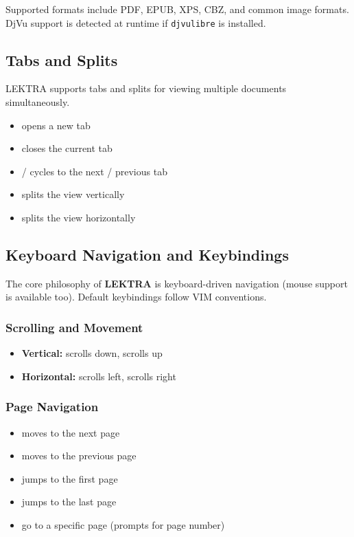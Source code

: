\documentclass[a4paper,12pt]{article}
\begin{document}
Supported formats include PDF, EPUB, XPS, CBZ, and common image formats. DjVu support is detected at runtime if \texttt{djvulibre} is installed.

\subsection{Tabs and Splits}

LEKTRA supports tabs and splits for viewing multiple documents simultaneously.

\begin{itemize}[leftmargin=*]
    \item {} opens a new tab
    \item {} closes the current tab
    \item {} /  cycles to the next / previous tab
    \item {} splits the view vertically
    \item {} splits the view horizontally
\end{itemize}

\subsection{Keyboard Navigation and Keybindings}

The core philosophy of \textbf{LEKTRA} is keyboard-driven navigation (mouse support is available too). Default keybindings follow VIM conventions.

\subsubsection{Scrolling and Movement}

\begin{itemize}[leftmargin=*]
    \item \textbf{Vertical:}  scrolls down,\;  scrolls up
    \item \textbf{Horizontal:}  scrolls left,\;  scrolls right
\end{itemize}

\subsubsection{Page Navigation}

\begin{itemize}[leftmargin=*]
    \item {} moves to the next page
    \item {} moves to the previous page
    \item {} jumps to the first page
    \item {} jumps to the last page
    \item {} go to a specific page (prompts for page number)
\end{itemize}
\end{document}
